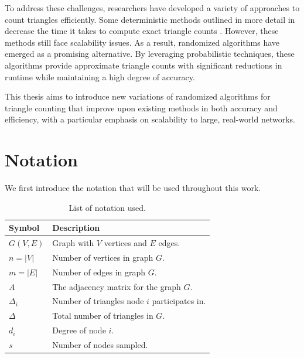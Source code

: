 \documentclass[11pt, margin=1in]{article}
\begin{document}
To address these challenges, researchers have developed a variety of approaches to count triangles efficiently.
Some deterministic methods outlined in more detail in  decrease the time it takes to compute exact triangle counts \cite{strassen_gaussian_1969}.
However, these methods still face scalability issues.
As a result, randomized algorithms \cite{tsourakakis_doulion_2009, seshadhri_triadic_2013, tsourakakis_fast_2008} have emerged as a promising alternative.
By leveraging probabilistic techniques, these algorithms provide approximate triangle counts with significant reductions in runtime while maintaining a high degree of accuracy.

This thesis aims to introduce new variations of randomized algorithms for triangle counting that improve upon existing methods in both accuracy and efficiency, with a particular emphasis on scalability to large, real-world networks.

\newpage

\section{Notation}

We first introduce the notation that will be used throughout this work.

\begin{table}[ht]
    \centering
    \caption{List of notation used.}
    \begin{tabular}{ll}
        \toprule
        \textbf{Symbol} & \textbf{Description} \\
        \midrule
        $G(V, E)$       & Graph with $V$ vertices and $E$ edges. \\
        $n = |V|$       & Number of vertices in graph $G$. \\
        $m = |E|$       & Number of edges in graph $G$. \\
        $A$             & The adjacency matrix for the graph $G$. \\
        $\Delta_i$      & Number of triangles node $i$ participates in. \\
        $\Delta$        & Total number of triangles in $G$. \\
        $d_i$           & Degree of node $i$. \\
        $s$             & Number of nodes sampled. \\
        \bottomrule
    \end{tabular}
    \label{tab:notation}
\end{table}
\end{document}
